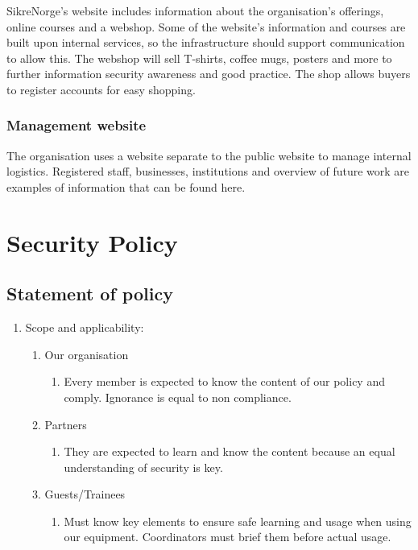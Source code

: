 SikreNorge's website includes information about the organisation's offerings, online courses and a webshop. Some of the website's information and courses are built upon internal services, so the infrastructure should support communication to allow this. The webshop will sell T-shirts, coffee mugs, posters and more to further information security awareness and good practice. The shop allows buyers to register accounts for easy shopping.

\subsubsection{Management website}

The organisation uses a website separate to the public website to manage internal logistics. Registered staff, businesses, institutions and overview of future work are examples of information that can be found here.


\section{Security Policy}


\subsection{Statement of policy}

\begin{enumerate}
  \item Scope and applicability:
  \begin{enumerate}
    \item Our organisation
      \begin{enumerate}
        \item Every member is expected to know the content of our policy and comply. Ignorance is equal to non compliance.
      \end{enumerate}
        \item Partners
      \begin{enumerate}
        \item They are expected to learn and know the content because an equal understanding of security is key.
      \end{enumerate}
        \item Guests/Trainees
      \begin{enumerate}
        \item Must know key elements to ensure safe learning and usage when using our equipment. Coordinators must brief them before actual usage.
      \end{enumerate}
  \end{enumerate}
\end{enumerate}

